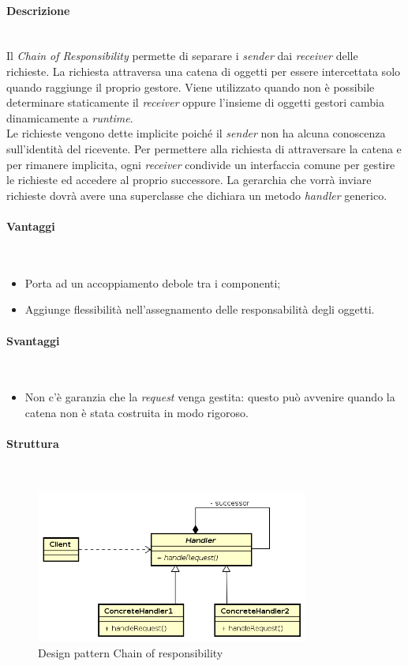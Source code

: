 \paragraph{Descrizione} \mbox{} \\
Il \textit{Chain of Responsibility} permette di separare i \textit{sender} dai \textit{receiver} delle richieste. La richiesta attraversa una catena di oggetti per essere intercettata solo quando raggiunge il proprio gestore. Viene utilizzato quando non è possibile determinare staticamente il \textit{receiver} oppure l’insieme di oggetti gestori cambia dinamicamente a \textit{runtime}. \\
Le richieste vengono dette implicite poiché il \textit{sender} non ha alcuna conoscenza sull’identità del ricevente. Per permettere alla richiesta di attraversare la catena e per rimanere implicita, ogni \textit{receiver} condivide un interfaccia comune per gestire le richieste ed accedere al proprio successore. La gerarchia che vorrà inviare richieste dovrà avere una superclasse che dichiara un metodo \textit{handler} generico.
\paragraph{Vantaggi} \mbox{} \\
\begin{itemize}
\item Porta ad un accoppiamento debole tra i componenti;
\item Aggiunge flessibilità nell’assegnamento delle responsabilità degli oggetti.
\end{itemize}
\paragraph{Svantaggi} \mbox{} \\
\begin{itemize}
\item Non c’è garanzia che la \textit{request} venga gestita: questo può avvenire quando la catena non è stata costruita in modo rigoroso.
\end{itemize}
\paragraph{Struttura} \mbox{} \\
\begin{figure}[H]
\centering
\includegraphics[width=0.8\textwidth]{res/sections/backend/chainOfResponsability.png}
\caption{Design pattern Chain of responsibility}
\end{figure}

